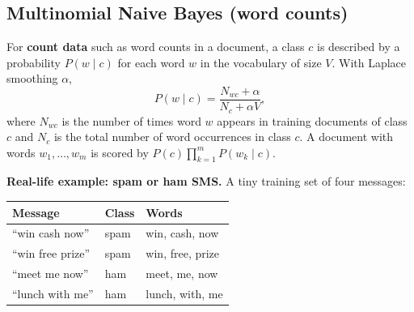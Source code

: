 \subsection{Multinomial Naive Bayes (word counts)}

\begin{definition}
For \textbf{count data} such as word counts in a document, a class $c$ is described by a probability $P(w\mid c)$ for each word $w$ in the vocabulary of size $V$. With Laplace smoothing $\alpha$,
\[
  P(w\mid c)=\frac{N_{wc}+\alpha}{N_c+\alpha V},
\]
where $N_{wc}$ is the number of times word $w$ appears in training documents of class $c$ and $N_c$ is the total number of word occurrences in class $c$. A document with words $w_1,\dots,w_m$ is scored by $P(c)\prod_{k=1}^{m}P(w_k\mid c)$.
\end{definition}

\textbf{Real-life example: spam or ham SMS.} A tiny training set of four messages:

\begin{center}
\begin{tabular}{@{}lll@{}}
\toprule
\textbf{Message} & \textbf{Class} & \textbf{Words}\\
\midrule
``win cash now'' & spam & win, cash, now\\
``win free prize'' & spam & win, free, prize\\
``meet me now'' & ham & meet, me, now\\
``lunch with me'' & ham & lunch, with, me\\
\bottomrule
\end{tabular}
\end{center}

